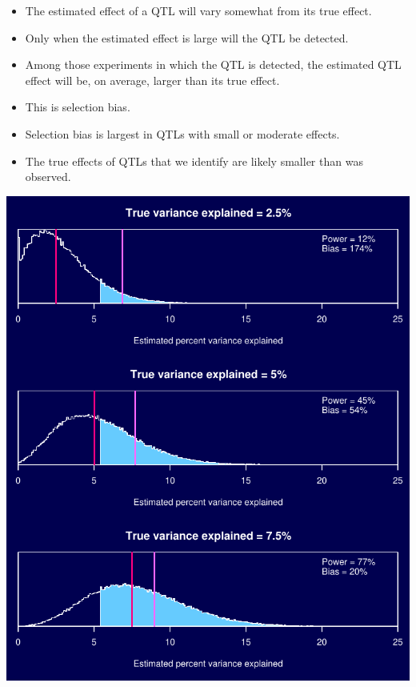 \documentclass[12pt]{article}
\newcommand{\smallestsize}{\fontsize{18}{22} \selectfont}
\begin{document}
\hspace*{0.5in}
\begin{minipage}[t]{4.1in}
\vspace*{5mm}

\sloppy
\smallestsize
\begin{itemize}
\setlength{\rightskip}{0pt plus 1fil} %
\item The estimated effect of a QTL will vary somewhat from its true
effect.
\item Only when the estimated effect is large will the QTL be
detected.
\item Among those experiments in which the QTL is detected, the estimated
QTL effect will be, on average, larger than its true effect.
\item This is {\color{mypink} selection bias}.
\item Selection bias is largest in QTLs with small or moderate effects.
\item The true effects of QTLs that we identify are likely smaller
than was observed.
\end{itemize}
\end{minipage}
\hfill
\begin{minipage}[t]{5.3in}
\vspace*{0mm}

\includegraphics{Figs/selbias.pdf}
\end{minipage}
\end{document}
